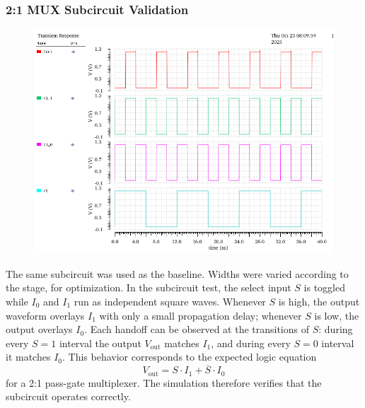 \documentclass[12pt]{article}
\begin{document}
\subsubsection*{2:1 MUX Subcircuit Validation}
\begin{figure}[H]
    \centering
    \includegraphics[width=\linewidth]{writeup//figures/muxsubval.png}
    \caption{}
\end{figure}

The same subcircuit was used as the baseline. Widths were varied according to the stage, for optimization. In the subcircuit test, the select input \( S \) is toggled while \( I_0 \) and \( I_1 \) run as independent square waves. 
Whenever \( S \) is high, the output waveform overlays \( I_1 \) with only a small propagation delay; whenever \( S \) is low, the output overlays \( I_0 \). 
Each handoff can be observed at the transitions of \( S \): during every \( S=1 \) interval the output \( V_{\text{out}} \) matches \( I_1 \), and during every \( S=0 \) interval it matches \( I_0 \). 
This behavior corresponds to the expected logic equation 
\[
V_{\text{out}} = S \cdot I_1 + \overline{S} \cdot I_0
\]
for a 2:1 pass-gate multiplexer. 
The simulation therefore verifies that the subcircuit operates correctly.
\end{document}

